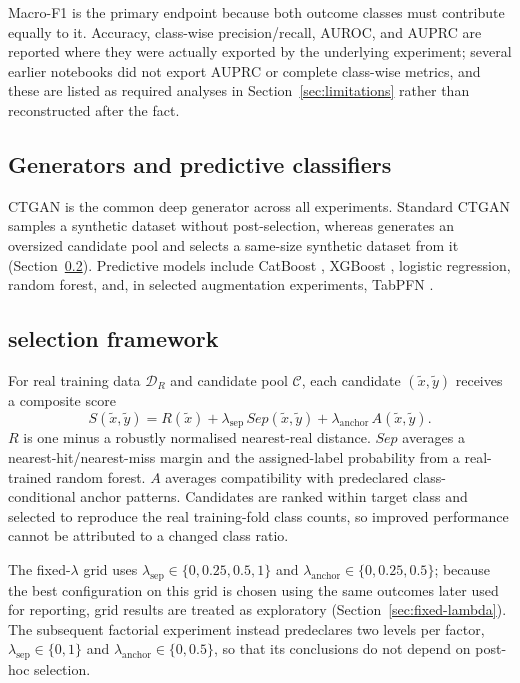 Macro-F1 is the primary endpoint because both outcome classes must contribute equally to it. Accuracy, class-wise precision/recall, AUROC, and AUPRC are reported where they were actually exported by the underlying experiment; several earlier notebooks did not export AUPRC or complete class-wise metrics, and these are listed as required analyses in Section~\ref{sec:limitations} rather than reconstructed after the fact.

\subsection{Generators and predictive classifiers}
\label{sec:generators}

CTGAN \citep{xu2019} is the common deep generator across all experiments. Standard CTGAN samples a synthetic dataset without post-selection, whereas \sepa{} generates an oversized candidate pool and selects a same-size synthetic dataset from it (Section~\ref{sec:sepaware}). Predictive models include CatBoost \citep{prokhorenkova2018}, XGBoost \citep{chen2016}, logistic regression, random forest, and, in selected augmentation experiments, TabPFN \citep{hollmann2025}.

\subsection{\sepa{} selection framework}
\label{sec:sepaware}

For real training data $\mathcal{D}_R$ and candidate pool $\mathcal{C}$, each candidate $(\tilde{x},\tilde{y})$ receives a composite score
\begin{equation}
S(\tilde{x},\tilde{y}) = R(\tilde{x}) + \lambda_{\mathrm{sep}}\,Sep(\tilde{x},\tilde{y}) + \lambda_{\mathrm{anchor}}\,A(\tilde{x},\tilde{y}).
\label{eq:sepaware}
\end{equation}
$R$ is one minus a robustly normalised nearest-real distance. $Sep$ averages a nearest-hit/nearest-miss margin and the assigned-label probability from a real-trained random forest. $A$ averages compatibility with predeclared class-conditional anchor patterns. Candidates are ranked within target class and selected to reproduce the real training-fold class counts, so improved \tstr{} performance cannot be attributed to a changed class ratio.

The fixed-$\lambda$ grid uses $\lambda_{\mathrm{sep}} \in \{0, 0.25, 0.5, 1\}$ and $\lambda_{\mathrm{anchor}} \in \{0, 0.25, 0.5\}$; because the best configuration on this grid is chosen using the same outcomes later used for reporting, grid results are treated as exploratory (Section~\ref{sec:fixed-lambda}). The subsequent factorial experiment instead predeclares two levels per factor, $\lambda_{\mathrm{sep}} \in \{0, 1\}$ and $\lambda_{\mathrm{anchor}} \in \{0, 0.5\}$, so that its conclusions do not depend on post-hoc selection.

